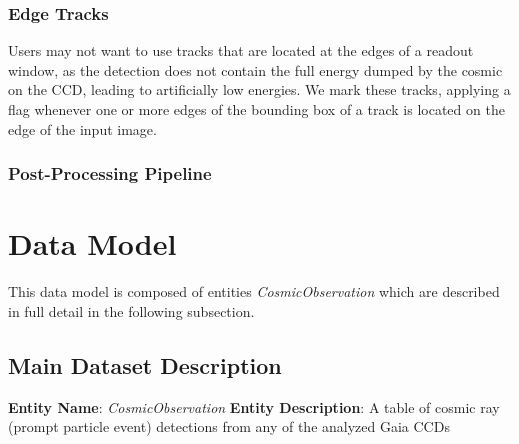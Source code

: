 \documentclass[a4paper, 11pt]{article}
\begin{document}
\subsubsection{Edge Tracks}

Users may not want to use tracks that are located at the edges of a readout window, as the detection does not contain the full energy dumped by the cosmic on the CCD, leading to artificially low energies.  We mark these tracks, applying a flag whenever one or more edges of the bounding box of a track is located on the edge of the input image.


\subsubsection{Post-Processing Pipeline}

\section{Data Model}
\label{sec:datamodel}

This data model is composed of entities {\it CosmicObservation} which are described in full detail in the following subsection.

\subsection{Main Dataset Description}
\label{sec:CosObsModel}

\textbf{Entity Name}:  \textit{CosmicObservation}
\newline
\newline
\textbf{Entity Description}:  A table of cosmic ray (prompt particle event) detections from any of the analyzed Gaia CCDs 
\newline
\newline
\end{document}
